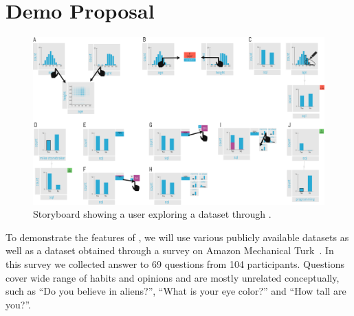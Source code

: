 \section{Demo Proposal}
\label{sec:scenarios}

\begin{figure}[h]
\center
\includegraphics[width=\textwidth]{figures/storyboard.pdf}
\caption{Storyboard showing a user exploring a dataset through \system{}.}
\label{fig:sb}
\end{figure}

To demonstrate the features of \system{}, we will use various publicly available datasets as well as a dataset obtained through a survey on Amazon Mechanical Turk~\cite{binnig2017sustainable}. In this survey we collected answer to 69 questions from 104 participants. Questions cover wide range of habits and opinions and are mostly unrelated conceptually, such as ``Do you believe in aliens?'',  ``What is your eye color?'' and ``How tall are you?''. 

